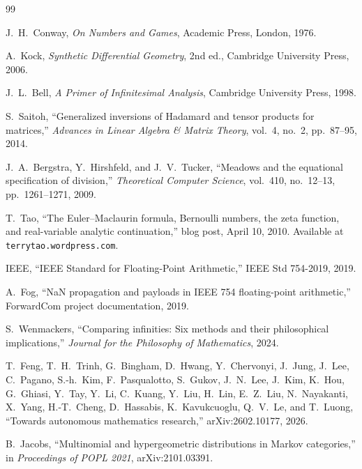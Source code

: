 \documentclass[12pt]{article}
\theoremstyle{definition}
\theoremstyle{remark}
\begin{document}
\begin{thebibliography}{99}

J.~H.~Conway, \emph{On Numbers and Games}, Academic Press, London, 1976.

A.~Kock, \emph{Synthetic Differential Geometry}, 2nd ed.,
Cambridge University Press, 2006.

J.~L.~Bell, \emph{A Primer of Infinitesimal Analysis},
Cambridge University Press, 1998.


S.~Saitoh, ``Generalized inversions of Hadamard and tensor products for
matrices,'' \emph{Advances in Linear Algebra \& Matrix Theory}, vol.~4,
no.~2, pp.~87--95, 2014.

J.~A.~Bergstra, Y.~Hirshfeld, and J.~V.~Tucker, ``Meadows and the
equational specification of division,'' \emph{Theoretical Computer Science},
vol.~410, no.~12--13, pp.~1261--1271, 2009.


T.~Tao, ``The Euler--Maclaurin formula, Bernoulli numbers, the zeta function,
and real-variable analytic continuation,'' blog post, April 10, 2010.
Available at \texttt{terrytao.wordpress.com}.


IEEE, ``IEEE Standard for Floating-Point Arithmetic,''
IEEE Std 754-2019, 2019.

A.~Fog, ``NaN propagation and payloads in IEEE 754 floating-point arithmetic,''
ForwardCom project documentation, 2019.


S.~Wenmackers, ``Comparing infinities: Six methods and their philosophical
implications,'' \emph{Journal for the Philosophy of Mathematics}, 2024.

T.~Feng, T.~H.~Trinh, G.~Bingham, D.~Hwang, Y.~Chervonyi, J.~Jung,
J.~Lee, C.~Pagano, S.-h.~Kim, F.~Pasqualotto, S.~Gukov, J.~N.~Lee,
J.~Kim, K.~Hou, G.~Ghiasi, Y.~Tay, Y.~Li, C.~Kuang, Y.~Liu, H.~Lin,
E.~Z.~Liu, N.~Nayakanti, X.~Yang, H.-T.~Cheng, D.~Hassabis,
K.~Kavukcuoglu, Q.~V.~Le, and T.~Luong,
``Towards autonomous mathematics research,''
arXiv:2602.10177, 2026.


B.~Jacobs, ``Multinomial and hypergeometric distributions in Markov
categories,'' in \emph{Proceedings of POPL 2021},
arXiv:2101.03391.


\end{thebibliography}
\end{document}
